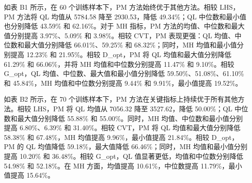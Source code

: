 \documentclass[]{interact}
\theoremstyle{plain}%
\theoremstyle{definition}
\theoremstyle{remark}
\begin{document}
		如表 B1 所示，在 60 个训练样本下，PM 方法始终优于其他方法。相较 LHS，PM 方法将 QL 均值从 5784.58 降至 2930.53，降低 49.34\%；QL 中位数和最小值也分别降低 43.59\% 和 62.16\%。对于 MH 指标，PM 方法的均值、中位数和最大值分别提高 3.97\%、5.09\% 和 3.98\%。相较 CVT，PM 表现更强：QL 均值、中位数和最大值分别降低 66.01\%、59.25\% 和 68.32\%；同时，MH 均值和最小值分别提高 12.23\% 和 21.95\%。相较 D\_opt，PM 将 QL 均值和最大值分别降低 61.29\% 和 66.06\%，并将 MH 均值和中位数分别提高 11.47\% 和 9.10\%。相较 G\_opt，QL 均值、中位数、最大值和最小值分别降低 59.50\%、51.08\%、61.10\% 和 45.84\%，MH 均值和中位数分别提高 9.44\% 和 9.91\%，最小值提高 19.52\%。

		\begin{table}[h!]
			\centering
			\caption{70 个训练样本下优化结果比较。}
			\label{tab:b2_70}
		\end{table}
		
		如表 B2 所示，在 70 个训练样本下，PM 方法在关键指标上持续优于所有其他方法。相较 LHS，PM 将 QL 均值从 7056.32 降至 3527.62，降低 50.00\%；QL 中位数和最大值分别降低 55.88\% 和 55.00\%。同时，MH 均值、中位数和最小值分别提高 6.80\%、6.39\% 和 31.40\%。相较 CVT，PM 将 QL 均值和最大值分别降低 58.38\% 和 67.48\%，MH 均值提高 9.96\%，最小值提高 21.84\%。相较 D\_opt，PM 的 QL 均值降低 59.18\%，最大值降低 66.46\%；同时，MH 均值和最小值分别提高 10.20\% 和 36.48\%。相较 G\_opt，QL 值显著更低，均值和中位数分别降低 54.98\% 和 52.18\%。在 MH 方面，均值提高 10.61\%，中位数提高 11.79\%，最小值提高 15.64\%。
\end{document}
